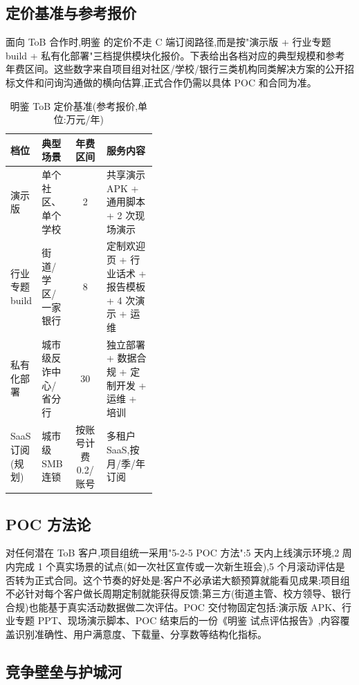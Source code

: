 \documentclass[UTF8,a4paper,12pt]{ctexart}
\begin{document}
\subsection{定价基准与参考报价}

面向 ToB 合作时,明鉴 的定价不走 C 端订阅路径,而是按"演示版 + 行业专题 build + 私有化部署"三档提供模块化报价。下表给出各档对应的典型规模和参考年费区间。这些数字来自项目组对社区/学校/银行三类机构同类解决方案的公开招标文件和问询沟通做的横向估算,正式合作仍需以具体 POC 和合同为准。

\begin{table}[!htbp]
    \centering
    \caption{明鉴 ToB 定价基准(参考报价,单位:万元/年)}
    \label{tab:pricing-benchmark}
    \renewcommand{\arraystretch}{1.4}
    \footnotesize
    \begin{tabularx}{\linewidth}{p{0.20\linewidth}p{0.22\linewidth}cY}
        \toprule
        档位 & 典型场景 & 年费区间 & 服务内容 \\
        \midrule
        演示版 & 单个社区、单个学校 & 2 & 共享演示 APK + 通用脚本 + 2 次现场演示 \\
        行业专题 build & 街道/学区/一家银行 & 8 & 定制欢迎页 + 行业话术 + 报告模板 + 4 次演示 + 运维 \\
        私有化部署 & 城市级反诈中心/省分行 & 30 & 独立部署 + 数据合规 + 定制开发 + 运维 + 培训 \\
        SaaS 订阅(规划) & 城市级 SMB 连锁 & 按账号计费 0.2/账号 & 多租户 SaaS,按月/季/年订阅 \\
        \bottomrule
    \end{tabularx}
\end{table}

\subsection{POC 方法论}

对任何潜在 ToB 客户,项目组统一采用"5-2-5 POC 方法":5 天内上线演示环境,2 周内完成 1 个真实场景的试点(如一次社区宣传或一次新生班会),5 个月滚动评估是否转为正式合同。这个节奏的好处是:客户不必承诺大额预算就能看见成果;项目组不必针对每个客户做长周期定制就能获得反馈;第三方(街道主管、校方领导、银行合规)也能基于真实活动数据做二次评估。POC 交付物固定包括:演示版 APK、行业专题 PPT、现场演示脚本、POC 结束后的一份《明鉴 试点评估报告》,内容覆盖识别准确性、用户满意度、下载量、分享数等结构化指标。

\subsection{竞争壁垒与护城河}
\end{document}
